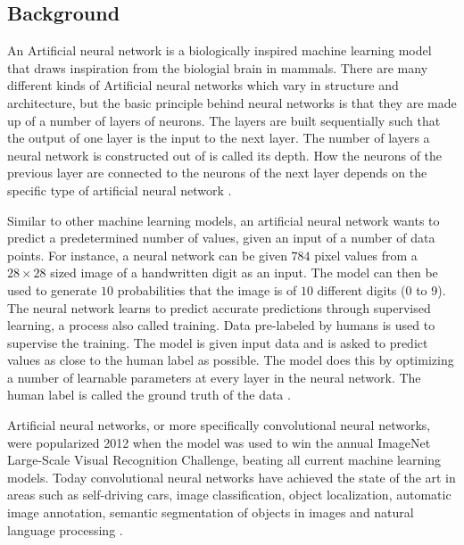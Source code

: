 \documentclass[a4paper, twoside]{article}
\begin{document}
\subsection{Background}

An Artificial neural network is a biologically inspired machine learning model that draws inspiration from the biologial brain in mammals. There are many different kinds of Artificial neural networks which vary in structure and architecture, but the basic principle behind neural networks is that they are made up of a number of layers of neurons. The layers are built sequentially such that the output of one layer is the input to the next layer. The number of layers a neural network is constructed out of is called its depth. How the neurons of the previous layer are connected to the neurons of the next layer depends on the specific type of artificial neural network \cite{cs231n}.

Similar to other machine learning models, an artificial neural network wants to predict a predetermined number of values, given an input of a number of data points. For instance, a neural network can be given $784$ pixel values from a $28 \times 28$ sized image of a handwritten digit as an input. The model can then be used to generate $10$ probabilities that the image is of $10$ different digits (0 to 9). The neural network learns to predict accurate predictions through supervised learning, a process also called training. Data pre-labeled by humans is used to supervise the training. The model is given input data and is asked to predict values as close to the human label as possible. The model does this by optimizing a number of learnable parameters at every layer in the neural network. The human label is called the ground truth of the data \cite{cs231n}.

Artificial neural networks, or more specifically convolutional neural networks, were popularized 2012 when the model was used to win the annual ImageNet Large-Scale Visual Recognition Challenge, beating all current machine learning models. Today convolutional neural networks have achieved the state of the art in areas such as self-driving cars, image classification, object localization, automatic image annotation, semantic segmentation of objects in images and natural language processing \cite{cs231n}.
\end{document}
